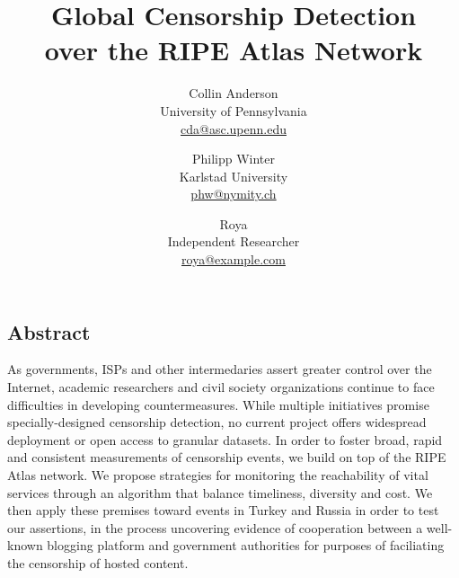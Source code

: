 \documentclass[letterpaper,twocolumn,10pt]{article}
\begin{document}
\date{}

\title{
	\Large \bf Global Censorship Detection \\
	over the RIPE Atlas Network
}

\author{
	{\rm Collin Anderson} \\
	University of Pennsylvania \\
	{\sf \href{mailto:cda@asc.upenn.edu}{cda@asc.upenn.edu}}
	\and
	{\rm Philipp Winter} \\
	Karlstad University \\
	{\sf \href{mailto:phw@nymity.ch}{phw@nymity.ch}}
	\and
	{\rm Roya} \\
	Independent Researcher \\
	{\sf \href{mailto:roya@example.com}{roya@example.com}}
}

\maketitle

\thispagestyle{empty}

\subsection*{Abstract}

As governments, ISPs and other intermedaries assert greater control over the
Internet, academic researchers and civil society organizations continue to face
difficulties in developing countermeasures.  While multiple initiatives promise
specially-designed censorship detection, no current project offers widespread
deployment or open access to granular datasets.
%
In order to foster broad, rapid and consistent measurements of censorship
events, we build on top of the RIPE Atlas network.  We propose strategies for
monitoring the reachability of vital services through an algorithm that balance
timeliness, diversity and cost.  We then apply these premises toward events in
Turkey and Russia in order to test our assertions, in the process uncovering
evidence of cooperation between a well-known blogging platform and government
authorities for purposes of faciliating the censorship of hosted content.






% 



%



% 

\raggedright
\printbibliography

\end{document}
